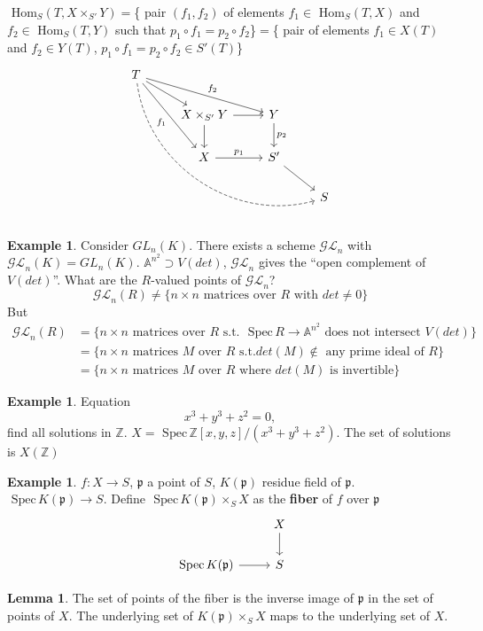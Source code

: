 \documentclass[11pt]{article}
\theoremstyle{definition}
\newtheorem{lemma}[thm]{Lemma}
\newtheorem{ex}[thm]{Example}
\renewcommand{\hom}{\text{ Hom}}
\newcommand{\spec}{\text{ Spec}\,}
\newcommand{\affn}{\mathbb A}
\newcommand{\intg}{\mathbb Z}
\newcommand{\scp}{{\mathfrak p}}
\newcommand{\lrta}{\longrightarrow}
\begin{document}
$\hom_S(T,X\times_{S'}Y)=$\{ pair $(f_1,f_2)$ of elements $f_1\in \hom_{S}(T,X)$ and $f_2\in \hom_S(T,Y)$  such that $p_1\circ f_1=p_2\circ f_2$\}$=$\{ pair of elements $f_1\in X(T)$ and $f_2\in Y(T)$, $p_1\circ f_1=p_2\circ f_2\in S'(T)$\}
$$
\begin{tikzcd}
T \arrow[rd] \arrow[rdd, "f_1"'] \arrow[rrd, "f_2"] \arrow[rrrddd, dashed, bend right=49] &  &  &  \\
 & X\times_{S'}Y \arrow[d] \arrow[r] & Y \arrow[d, "p_2"] &  \\
 & X \arrow[r, "p_1"] & S' \arrow[rd] &  \\
 &  &  & S
\end{tikzcd}
$$
\begin{ex}Consider
$GL_n(K)$. There exists a scheme $\mathcal{GL}_n$ with $\mathcal{GL}_n(K)=GL_n(K)$.
$\affn^{n^2}\supset V(det)$, $\mathcal{GL}_n$ gives the ``open complement of $V(det)$''. What are the $R$-valued points of $\mathcal{GL}_n$?
$$
\mathcal{GL}_n(R)\neq \{n\times n\text{ matrices over $R$ with } det \neq 0 \}
$$
But
$$
\begin{aligned}
\mathcal{GL}_n(R)&=\{n\times n\text{ matrices over $R$ s.t. }\spec R\lrta \affn^{n^2}\text{ does not intersect }V(det)\}\\
&=\{n\times n\text{ matrices $M$ over $R$ s.t.} det(M) \notin\text{ any prime ideal of }R \}\\
&=\{n\times n\text{ matrices $M$ over $R$ where } det(M)\text{ is invertible}\}
\end{aligned}
$$
\end{ex}

\begin{ex}
Equation
$$
x^3+y^3+z^2=0,
$$
find all solutions in $\intg$. 
$X=\spec \intg[x,y,z]/(x^3+y^3+z^2)$. The set of solutions is $X(\intg)$
\end{ex}

\begin{ex}
$f:X\lrta S$, $\scp$ a point of $S$,
$K(\scp)$ residue field of $\scp$. $\spec K(\scp)\lrta S$. Define $\spec K(\scp)\times_S X$ as the \textbf{fiber} of $f$ over $\scp$
$$
\begin{tikzcd}
 & X \arrow[d] \\
\spec K(\scp) \arrow[r] & S
\end{tikzcd}
$$
\end{ex}
\begin{lemma}
The set of points of the fiber is the inverse image of $\scp$ in the  set of points of $X$. The underlying set of $K(\scp)\times_SX$ maps to the underlying set of $X$.


\end{lemma}
\end{document}
